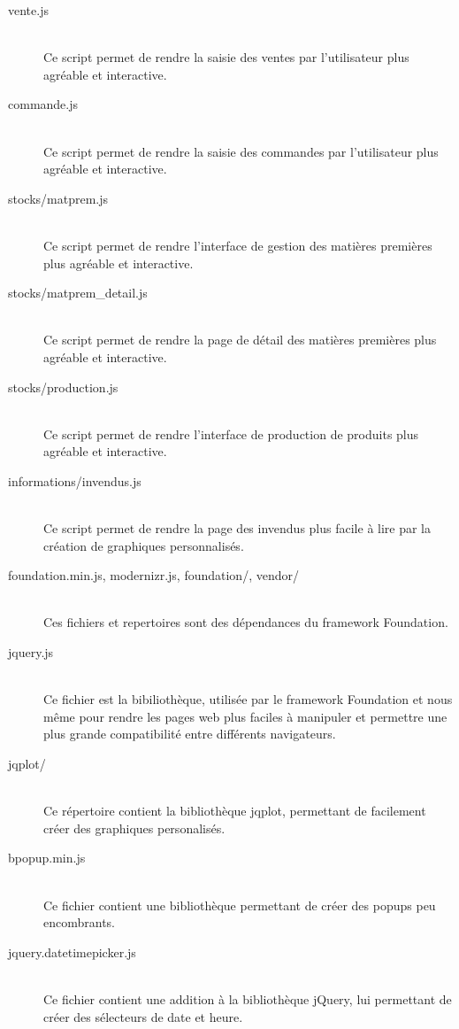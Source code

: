 \begin{description}
            \item[vente.js]\hfill \\
                Ce script permet de rendre la saisie des ventes par 
                l'utilisateur plus agréable et interactive.
            \item[commande.js]\hfill \\
                Ce script permet de rendre la saisie des commandes par 
                l'utilisateur plus agréable et interactive.
            \item[stocks/matprem.js]\hfill \\
                Ce script permet de rendre l'interface de gestion des matières
                premières plus agréable et interactive.
            \item[stocks/matprem\_detail.js]\hfill \\
                Ce script permet de rendre la page de détail des matières
                premières plus agréable et interactive.
            \item[stocks/production.js]\hfill \\
                Ce script permet de rendre l'interface de production de
                produits plus agréable et interactive.
            \item[informations/invendus.js]\hfill \\
                Ce script permet de rendre la page des invendus plus facile
                à lire par la création de graphiques personnalisés.
            \item[foundation.min.js, modernizr.js, foundation/, vendor/]\hfill \\
                Ces fichiers et repertoires sont des dépendances du framework
                Foundation.
            \item[jquery.js]\hfill \\
                Ce fichier est la bibiliothèque, utilisée par le framework
                Foundation et nous même pour rendre les pages web plus faciles
                à manipuler et permettre une plus grande compatibilité entre
                différents navigateurs.
            \item[jqplot/]\hfill \\
                Ce répertoire contient la bibliothèque jqplot, permettant
                de facilement créer des graphiques personalisés.
            \item[bpopup.min.js]\hfill \\
                Ce fichier contient une bibliothèque permettant de créer des
                popups peu encombrants.
            \item[jquery.datetimepicker.js]\hfill \\
                Ce fichier contient une addition à la bibliothèque jQuery, lui
                permettant de créer des sélecteurs de date et heure.
        \end{description}


